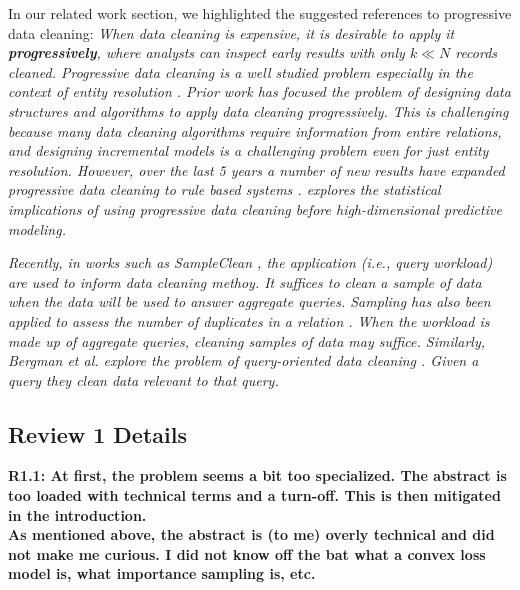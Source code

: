 \vspace{0.5em}
In our related work section, we highlighted the suggested references to progressive data cleaning:
\emph{When data cleaning is expensive, it is desirable to apply it \textbf{progressively}, where analysts can inspect early results with only $k \ll N$ records cleaned.
Progressive data cleaning is a well studied problem especially in the context of entity resolution \cite{altowim2014progressive, whang2014incremental, papenbrock2015progressive, gruenheid2014incremental}.
Prior work has focused the problem of designing data structures and algorithms to apply data cleaning progressively.
This is challenging because many data cleaning algorithms require information from entire relations, and designing incremental models is a challenging problem even for just entity resolution.
However, over the last 5 years a number of new results have expanded progressive data cleaning to rule based systems \cite{mayfield2010eracer, DBLP:journals/pvldb/YakoutENOI11, yakout2013don}.
\sys explores the statistical implications of using progressive data cleaning before high-dimensional predictive modeling.}

\vspace{0.5em}

\emph{Recently, in works such as SampleClean \cite{wang1999sample}, the application (i.e., query workload) are used to inform data cleaning methoy.
It suffices to clean a sample of data when the data will be used to answer aggregate queries.
Sampling has also been applied to assess the number of duplicates in a relation \cite{heise2014estimating}.
When the workload is made up of aggregate queries, cleaning samples of data may suffice. 
Similarly, Bergman et al. explore the problem of query-oriented data cleaning \cite{DBLP:conf/sigmod/BergmanMNT15}. Given a query they clean data relevant to that query. }

\subsection*{Review 1 Details} 

\noindent\textbf{R1.1: At first, the problem seems a bit too specialized. The abstract is too loaded with technical terms and a turn-off. This is then mitigated in the introduction. \\
As mentioned above, the abstract is (to me) overly technical and did not make me curious. I did not know off the bat what a convex loss model is, what importance sampling is, etc.}

